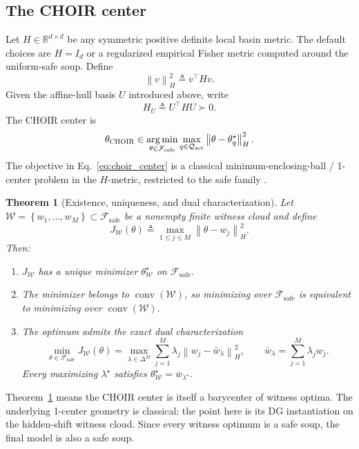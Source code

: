 \documentclass{article}
\newtheorem{theorem}{Theorem}
\newcommand{\RR}{\mathbb{R}}
\newcommand{\cF}{\mathcal{F}}
\newcommand{\cQ}{\mathcal{Q}}
\newcommand{\cW}{\mathcal{W}}
\newcommand{\argmin}{\operatorname*{arg\,min}}
\newcommand{\conv}{\operatorname{conv}}
\newcommand{\simplex}{\Delta}
\newcommand{\choir}{\textup{\textsc{CHOIR}}}
\newcommand{\norm}[1]{\left\lVert #1 \right\rVert}
\newcommand{\braces}[1]{\left\{ #1 \right\}}
\newcommand{\safe}{\mathrm{safe}}
\newcommand{\act}{\mathrm{act}}
\begin{document}
\subsection{The \choir{} center}

Let \(H\in\RR^{d\times d}\) be any symmetric positive definite local basin metric. The default choices are \(H=I_d\) or a regularized empirical Fisher metric computed around the uniform-safe soup. Define
\[
\norm{v}_H^2 \triangleq v^\top H v.
\]
Given the affine-hull basis \(U\) introduced above, write
\[
H_U \triangleq U^\top H U \succ 0.
\]
The \choir{} center is
\begin{equation}
\theta_{\choir}
\in
\argmin_{\theta\in\cF_{\safe}}
\max_{q\in\cQ_{\act}}
\norm{\theta-\theta_q^\star}_{H}^{2}.
\label{eq:choir_center}
\end{equation}
The objective in Eq.~\eqref{eq:choir_center} is a classical minimum-enclosing-ball / 1-center problem in the \(H\)-metric, restricted to the safe family \citep{megiddo1983linear,welzl1991smallest}.

\begin{theorem}[Existence, uniqueness, and dual characterization]
\label{thm:center_dual}
Let \(\cW=\braces{w_1,\ldots,w_M}\subset \cF_{\safe}\) be a nonempty finite witness cloud and define
\[
J_{\cW}(\theta)
\triangleq
\max_{1\le j\le M}\norm{\theta-w_j}_H^2.
\]
Then:
\begin{enumerate}[label=(\alph*),leftmargin=1.4em]
    \item \(J_{\cW}\) has a unique minimizer \(\theta_{\cW}^\star\) on \(\cF_{\safe}\).
    \item The minimizer belongs to \(\conv(\cW)\), so minimizing over \(\cF_{\safe}\) is equivalent to minimizing over \(\conv(\cW)\).
    \item The optimum admits the exact dual characterization
    \begin{equation}
    \min_{\theta\in\cF_{\safe}} J_{\cW}(\theta)
    =
    \max_{\lambda\in\simplex^{M}}
    \sum_{j=1}^{M}\lambda_j
    \norm{w_j-\bar w_\lambda}_H^2,
    \qquad
    \bar w_\lambda = \sum_{j=1}^{M}\lambda_j w_j.
    \label{eq:center_dual}
    \end{equation}
    Every maximizing \(\lambda^\star\) satisfies \(\theta_{\cW}^\star=\bar w_{\lambda^\star}\).
\end{enumerate}
\end{theorem}

Theorem~\ref{thm:center_dual} means the \choir{} center is itself a barycenter of witness optima. The underlying 1-center geometry is classical; the point here is its DG instantiation on the hidden-shift witness cloud. Since every witness optimum is a safe soup, the final model is also a safe soup.
\end{document}
